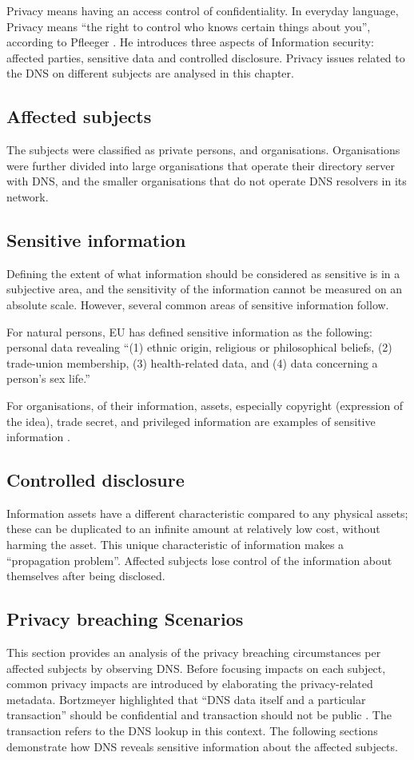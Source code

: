 Privacy means having an access control of confidentiality.
In everyday language, Privacy means ``the right to control who knows certain things about you'', according to Pfleeger \cite{securityincomputing}.
He introduces three aspects of Information security: affected parties, sensitive data and controlled disclosure.
Privacy issues related to the DNS on different subjects are analysed in this chapter.

\subsection{Affected subjects}
The subjects were classified as private persons, and organisations. Organisations were further divided into large organisations that operate their directory server with DNS, and the smaller organisations that do not operate DNS resolvers in its network.

\subsection{Sensitive information}\label{sensitiveinformation}
Defining the extent of what information should be considered as sensitive is in a subjective area, and the sensitivity of the information cannot be measured on an absolute scale.
However, several common areas of sensitive information follow.

For natural persons, EU \cite{GDPR} has defined sensitive information as the following: personal data revealing ``(1) ethnic origin, religious or philosophical beliefs, (2) trade-union membership, (3) health-related data, and (4) data concerning a person's sex life.''

For organisations, of their information, assets, especially copyright (expression of the idea), trade secret, and privileged information are examples of sensitive information \cite{securityincomputing}.

\subsection{Controlled disclosure}
Information assets have a different characteristic compared to any physical assets; these can be duplicated to an infinite amount at relatively low cost, without harming the asset.
This unique characteristic of information makes a ``propagation problem''.
Affected subjects lose control of the information about themselves after being disclosed.

\subsection{Privacy breaching Scenarios}
This section provides an analysis of the privacy breaching circumstances per affected subjects by observing DNS. Before focusing impacts on each subject, common privacy impacts are introduced by elaborating the privacy-related metadata.
Bortzmeyer highlighted that ``DNS data itself and a particular transaction'' should be confidential and transaction should not be public \cite{rfc7626}. The transaction refers to the DNS lookup in this context.
The following sections demonstrate how DNS reveals sensitive information about the affected subjects.

